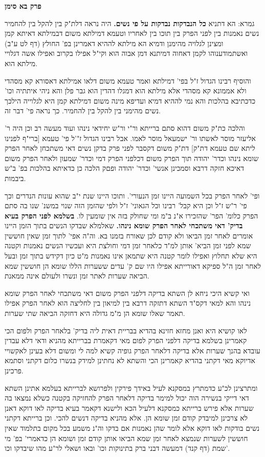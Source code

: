 \documentclass[12pt, openany]{book}
\newcommand{\sethebfont}{
\fontsize{10.5pt}{21.0pt} \selectfont
}
\newcommand{\twocol}[1]{
	{\sethebfont \begin{multicols}{2}
			#1
	\end{multicols}}	
}
\newcommand{\chapname}{}
\newcommand{\newchap}[1]{
	\addcontentsline{toc}{chapter}{#1}
	\renewcommand{\chapname}{#1}
		\begin{center}
			\textbf{%
\fontsize{16pt}{16pt}\selectfont
				#1}
		\end{center}
}
\begin{document}
\newchap{פרק  בא סימן}
\twocol{גמרא: הא דתניא \textbf{כל הנבדקות נבדקות על פי נשים.} היה נראה דלת"ק בין להקל בין להחמיר נשים נאמנות בין לפני הפרק בין תוכו בין לאחריו וטעמא דמילתא משום דבמילתא דאיתא קמן ומצינן לגלויה מהימנן ודמיא הא מילתא לההיא דאמרינן בפ' החולץ (דף לט ע"ב) ואשתמודענוהו לקמן דאחוה דמיתנא דמן אבוה הוא וקי"ל אפילו בקרוב ואפילו אשה דגלויי מילתא הוא.\par והוסיף רבינו הגדול ז"ל בפי' דמילתא ואמר טעמא משום דלאו אמילתא דאסורא קא מסהדי ולא אממונא קא מסהדי אלא מילתא הוא דמגלו דהדין הוא גבר פלן והא ניהי איתתיה וכו' כדכתיבא בהלכות והא נמי לההיא דמיא ועדיפא מינה משום דמילתא קמן היא לגלוייה הילכך נשים מהימני בין להקל בין להחמיר. כך נראה פי' דבר זה.\par והלכה כת"ק משום דהוא סתם ברייתא ור"י ור"ש יחידאי נינהו ועוד מעשה רב וכן היה ר' אליעזר מוסר לאשתו ור' ישמעאל מוסר לאמו. אבל רבינו הגדול ז"'ל פי' טעמא {\small [ברי"ף לפנינו ליתא שם טעמא דת"ק]} דת"ק משום דקסבר לפני פרק בדקן נשים דאי משתכחן לאחר הפרק שומא נינהו וכדר' יהודה תוך הפרק משום דכלפני הפרק דמי וכדר' שמעון ולאחר הפרק משום דאיכא חזקה דרבא וסמכינן אנשי' וכדר' יהודה ופםק הלכה כן כדאיתא בהלכות בפ' ב"ש ביבמות.\par ופי' לאחר הפרק בכל השמועה היינו זמן הנעורי'. ותוכו היינו שנת י"ב שהוא עונות הנדרים וכך פי' ר"ש ז"ל וכן היא קבל' רבינו וכל הגאוני' ז"ל ולפי שהזמן הזה שנוי במשנ' שנו בה סתם הפרק כלומ' הפר' שהזכירו א"נ ב"מ ומי שחולק בזה אין שומעין לו. 
\textbf{בשלמא לפני הפרק בעיא בדיק' דאי משתכחי לאחר הפרק שומא נינהו.} שאלמלא שבדקו הנשים בתוך הזמן היינו אומרים לאחר זמן הביאו ולא קודם לכן שאורח בזמנו בא. וה"ה אפי' לתוך זמן שאין חוששין שמא לפני זמן הביא' אותן למ"ד כלאחר זמן דמי וחולצת היא ועכשיו הנשים נאמנות וקטנה היא שלא תחלוץ ואפילו לומר קטנה היא שתמאן אינו נאמנות מ"ט כיון דקידש בתוך זמן ובעל לאחר זמן ה"ל ספיקא דאורייתא אפילו היו שם ק' עדים ששערות הללו שומא הן חוששין שמא הביאה שערות לאתר זמן ונשרו ולעולם אינה ממאנת.\par ואי קשיא היכי ניחא לן השתא בדיקה דלפני הפרק משום דאי משתכחי לאחר הפרק שומא נינהו והא למאי דקס"ד השתא דתזקה דרבא בין למיאון בין לחליצה הוא לאחר הפרק אפילו תאמר שאלו שומא הן מ"מ גדולה היא דחזקה הביאה שתי שערות.\par לאו קושיא היא ואנן מחזא חזינא בהדיא בבריית דאית ליה בדיק' בלאחר הפרק ולפום הכי קאמרינן בשלמא בדיקה דלפני הפרק לפום מאי דקאמרת בברייתא מהניא ודאי דלא עבדין עובדא בהנך שערות אלא בדיקה דלאחר הפרק גופיה קשיא למה לי ומשום דלא בעינן לאקשויי אדיוקא מאי דקתני בהדיא קאמרינן הכי והשתא לא נחתינן למידק בנשרו כלום דקתני וסתמא פרכינן.\par ומתרצינן לכ"ע כדמתרץ במסקנא לעיל באידך פירקין ולפרושא לברייתא בעלמא אתינן השתא דאי דייקי בנשירה הוה יכול למימר בדיקה דלאחר הפרק להחזיקה בקטנה כשלא נמצאו בה שערות אלא פירש ברייתא כמסקנא דלעיל הכא ולישנא דקאמר בעיא בדיקה לאו דוקא דאנן לא צרכינן למיבדק קודם זמן שומא הן. אלא מהניא בדיקה דנשים להכי. וכן ברייתא דקתני נשים בודקות לאו דוקא אלא לומר שהן נאמנות אם בדקו וה"נ משמע בכל מקום בתלמוד שאין חוששין לשערות שנמצא לאחר זמן שמא הביאו אותן קודם זמן ושומא הן כדאמרי' בפ' מי שמת (דף קנד) דמעשה דבני ברק בתינוקות וכו' ובאו ושאלי לר"ע מהו שיבדקו וכו'. 
}
\end{document}
